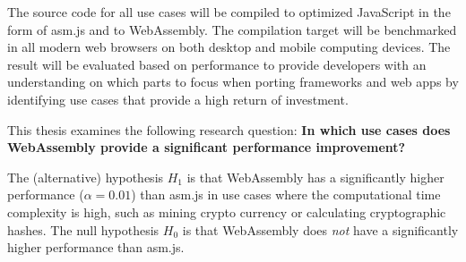 The source code for all use cases will be compiled to optimized JavaScript in the form of asm.js and to WebAssembly. The compilation target will be benchmarked in all modern web browsers on both desktop and mobile computing devices. The result will be evaluated based on performance to provide developers with an understanding on which parts to focus when porting frameworks and web apps by identifying use cases that provide a high return of investment.

This thesis examines the following research question: \textbf{In which use cases does WebAssembly provide a significant performance improvement?}


The (alternative) hypothesis $H_{1}$ is that WebAssembly has a significantly higher performance ($\alpha = 0.01$) than asm.js in use cases where the computational time complexity is high, such as mining crypto currency \parencite{RuthZimmermannWolsingHohlfeld2018} or calculating cryptographic hashes. The null hypothesis $H_{0}$ is that WebAssembly does \emph{not} have a significantly higher performance than asm.js.
